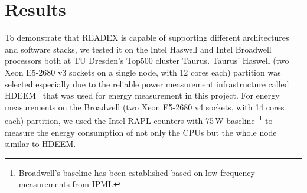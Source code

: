 \section{Results} \label{sec:results}
To demonstrate that READEX is capable of supporting different architectures and software stacks, we tested it on the Intel Haswell and Intel Broadwell processors both at TU Dresden's Top500 cluster Taurus. Taurus' Haswell (two Xeon E5-2680 v3 sockets on a single node, with 12 cores each) partition was selected especially due to the reliable power measurement infrastructure called HDEEM~\cite{hdeem} that was used for energy measurement in this project. For energy measurements on the Broadwell (two Xeon E5-2680 v4 sockets, with 14 cores each) partition, we used the Intel RAPL counters with 75\,W baseline~\footnote{Broadwell's baseline has been established based on low frequency measurements from IPMI.} to measure the energy consumption of not only the CPUs but the whole node similar to HDEEM.


